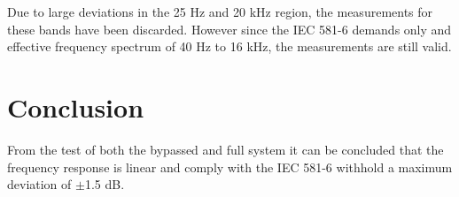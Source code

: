 Due to large deviations in the 25 Hz and 20 kHz region, the measurements for these bands have been discarded. However since the IEC 581-6 demands only and effective frequency spectrum of 40 Hz to 16 kHz, the measurements are still valid.

\section{Conclusion}
From the test of both the bypassed and full system it can be concluded that the frequency response is linear and comply with the IEC 581-6 withhold a maximum deviation of $\pm$1.5 dB.